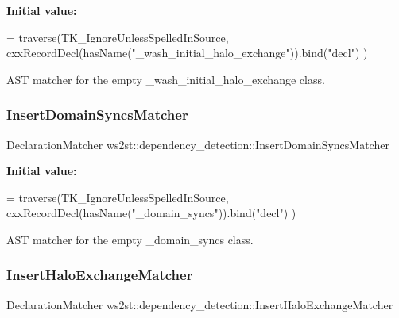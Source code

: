 {\bfseries Initial value\+:}
\begin{DoxyCode}
= traverse(TK\_IgnoreUnlessSpelledInSource, 
        cxxRecordDecl(hasName(\textcolor{stringliteral}{"\_wash\_initial\_halo\_exchange"})).bind(\textcolor{stringliteral}{"decl"})
    )
\end{DoxyCode}


A\+ST matcher for the empty \+\_\+wash\+\_\+initial\+\_\+halo\+\_\+exchange class. 

\mbox{\label{namespacews2st_1_1dependency__detection_ae64f771d376afa52054c5d9563d242f2}} 
\subsubsection{\texorpdfstring{Insert\+Domain\+Syncs\+Matcher}{InsertDomainSyncsMatcher}}
{\footnotesize\ttfamily Declaration\+Matcher ws2st\+::dependency\+\_\+detection\+::\+Insert\+Domain\+Syncs\+Matcher}

{\bfseries Initial value\+:}
\begin{DoxyCode}
= traverse(TK\_IgnoreUnlessSpelledInSource, 
        cxxRecordDecl(hasName(\textcolor{stringliteral}{"\_domain\_syncs"})).bind(\textcolor{stringliteral}{"decl"})
    )
\end{DoxyCode}


A\+ST matcher for the empty \+\_\+domain\+\_\+syncs class. 

\mbox{\label{namespacews2st_1_1dependency__detection_aa3946ed2a34fd136544f447954b530e1}} 
\subsubsection{\texorpdfstring{Insert\+Halo\+Exchange\+Matcher}{InsertHaloExchangeMatcher}}
{\footnotesize\ttfamily Declaration\+Matcher ws2st\+::dependency\+\_\+detection\+::\+Insert\+Halo\+Exchange\+Matcher}

